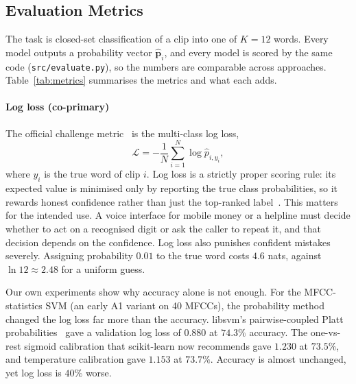 \subsection{Evaluation Metrics}
\label{sec:metrics}

The task is closed-set classification of a clip into one of $K=12$ words. Every model outputs a probability
vector $\hat{\mathbf{p}}_i$, and every model is scored by the same code (\texttt{src/evaluate.py}), so the
numbers are comparable across approaches. Table~\ref{tab:metrics} summarises the metrics and what each adds.

\paragraph{Log loss (co-primary)}
The official challenge metric~\cite{zindi2021swahili} is the multi-class log loss,
\begin{equation}
  \mathcal{L} = -\frac{1}{N}\sum_{i=1}^{N} \log \hat{p}_{i,y_i},
\end{equation}
where $y_i$ is the true word of clip $i$. Log loss is a strictly proper scoring rule: its expected value is
minimised only by reporting the true class probabilities, so it rewards honest confidence rather than just the
top-ranked label~\cite{gneiting2007strictly}. This matters for the intended use. A voice interface for mobile
money or a helpline must decide whether to act on a recognised digit or ask the caller to repeat it, and that
decision depends on the confidence. Log loss also punishes confident mistakes severely. Assigning probability
$0.01$ to the true word costs $4.6$ nats, against $\ln 12 \approx 2.48$ for a uniform guess.

Our own experiments show why accuracy alone is not enough. For the MFCC-statistics SVM (an early A1 variant on 40 MFCCs), the probability
method changed the log loss far more than the accuracy. libsvm's pairwise-coupled Platt
probabilities~\cite{platt1999probabilistic,wu2004probability} gave a validation log loss of $0.880$ at $74.3\%$
accuracy. The one-vs-rest sigmoid calibration that scikit-learn now recommends gave $1.230$ at $73.5\%$, and
temperature calibration gave $1.153$ at $73.7\%$. Accuracy is almost unchanged, yet log loss is $40\%$ worse.


